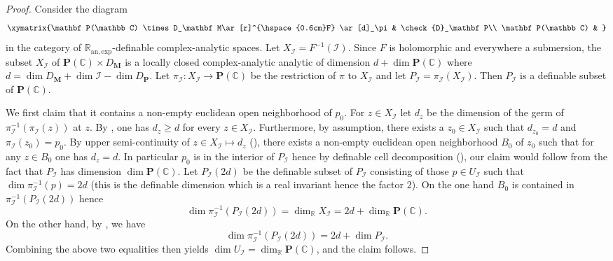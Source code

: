 \documentclass[10pt]{article}
\numberwithin{equation}{subsection}
\theoremstyle{plain}
\theoremstyle{definition}
\theoremstyle{remark}
\newcommand{\I}{\mathscr{I}}
\newcommand{\anexp}{\mathbb{R}_\mathrm{an,exp}}
\newcommand{\C}{\mathbb C}
\newcommand{\R}{\mathbb R}
\newcommand{\pp}{\mathbf P}
\newcommand{\M}{\mathbf M}
\begin{document}
\begin{proof}
Consider the diagram
\[
\xymatrix{\pp(\C) \times D_\M \ar[r]^{\hspace{0.6cm}F} \ar[d]_\pi & \check{D}_\pp \\ \pp(\C) & }
\]
in the category of $\anexp$-definable complex-analytic spaces. Let $X_\I = F^{-1}(\I)$. Since $F$ is holomorphic and everywhere a submersion, the subset $X_\I$ of $\pp(\C) \times D_\M$ is a locally closed complex-analytic analytic of dimension $d + \dim \pp(\C)$ where $d = \dim D_\M + \dim \I - \dim D_\pp$. Let $\pi_\I : X_\I \rightarrow \pp(\C)$ be the restriction of $\pi$ to $X_\I$ and let $P_\I = \pi_\I(X_\I)$. Then $P_\I$ is a definable subset of $\pp(\C)$.

We first claim that it contains a non-empty euclidean open neighborhood of $p_0$. For $z \in X_\I$ let $d_z$ be the dimension of the germ of $\pi_\I^{-1}(\pi_\I(z))$ at $z$. By \cite[V.3, Cor. 2]{compan}, one has $d_z \geqslant d$ for every $z \in X_\I$. Furthermore, by assumption, there exists a $z_0 \in X_\I$ such that $d_{z_0} = d$ and $\pi_\I(z_0) = p_0$. By upper semi-continuity of $z \in X_\I \mapsto d_z$ (\cite[V.3, Thm. 3]{compan}), there exists a non-empty euclidean open neighborhood $B_0$ of $z_0$ such that for any $z \in B_0$ one has $d_z = d$. In particular $p_0$ is in the interior of $P_\I$ hence by definable cell decomposition (\cite[III. (2.11)]{vdd}), our claim would follow from the fact that $P_\I$ has dimension $\dim \pp(\C)$. Let $P_\I(2d)$ be the definable subset of $P_\I$ consisting of those $p \in U_\I$ such that $\dim \pi_\I^{-1}(p) = 2d$ (this is the definable dimension which is a real invariant hence the factor $2$). On the one hand $B_0$ is contained in $\pi_\I^{-1}(P_\I(2d))$ hence 
\[
\dim \pi_\I^{-1}(P_\I(2d)) = \dim_\R X_\I = 2d + \dim_\R \pp(\C).
\]
On the other hand, by \cite[Chap. 4, (1.5)]{vdd}, we have
\[
\dim \pi_\I^{-1}(P_\I(2d)) = 2d + \dim P_\I.
\]
Combining the above two equalities then yields $\dim U_\I = \dim_\R \pp(\C)$, and the claim follows.


\end{proof}
\end{document}
